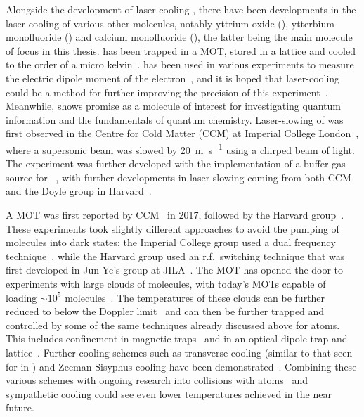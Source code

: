 Alongside the development of laser-cooling \SrF{}, there have been developments
in the laser-cooling of various other molecules, notably yttrium oxide (\YO{}),
ytterbium monofluoride (\YbF{}) and calcium monofluoride (\CaF{}), the latter
being the main molecule of focus in this thesis. \YO{} has been trapped in a
MOT, stored in a lattice and cooled to the order of a micro
kelvin~\cite{PhysRevLett.127.263201}. \YbF{} has been used in various
experiments to measure the electric dipole moment of the
electron~\cite{Hudson2011}, and it is hoped that laser-cooling could be a
method for further improving the precision of this experiment~\cite{Fitch2020}.
Meanwhile, \CaF{} shows promise as a molecule of interest for investigating
quantum information and the fundamentals of quantum chemistry. Laser-slowing of
\CaF{} was first observed in the Centre for Cold Matter (CCM) at Imperial
College London~\cite{PhysRevA.89.053416}, where a supersonic beam was slowed by
\SI{20}{\meter\per\second} using a chirped beam of light. The \CaF{} experiment
was further developed with the implementation of a buffer gas source for
\CaF{}~\cite{Truppe2018}, with further developments in laser slowing coming
from both CCM~\cite{Truppe2017a} and the Doyle group in
Harvard~\cite{0953-4075-49-17-174001}.

A \CaF{} MOT was first reported by CCM~\cite{Williams2017} in 2017, followed by
the Harvard group~\cite{PhysRevLett.119.103201}. These experiments took
slightly different approaches to avoid the pumping of molecules into dark
states: the Imperial College group used a dual frequency
technique~\cite{TarbuttandSteimle}, while the Harvard group used an r.f.\
switching technique that was first developed in Jun Ye's group at
JILA~\cite{PhysRevLett.110.143001}.  The \CaF{} MOT has opened the door to
experiments with large clouds of \CaF{} molecules, with today's MOTs capable of
loading $\sim10^5$ molecules~\cite{PhysRevLett.119.103201}. The temperatures of
these clouds can be further reduced to below the Doppler
limit~\cite{Truppe2017, PhysRevLett.123.033202} and can then be further trapped
and controlled by some of the same techniques already discussed above for
atoms. This includes confinement in magnetic traps~\cite{WilliamsMagnetic2018}
and in an optical dipole trap and lattice~\cite{Anderegg2019a}. Further cooling schemes such as
transverse cooling (similar to that seen for \YbF{} in \inlineref{Alauze2021})
and Zeeman-Sisyphus cooling have been demonstrated~\cite{Fitch2016,
PhysRevLett.127.263002}.  Combining these various schemes with ongoing research
into collisions with atoms~\cite{PhysRevLett.126.153401} and sympathetic
cooling could see even lower \CaF{} temperatures achieved in the near future.

